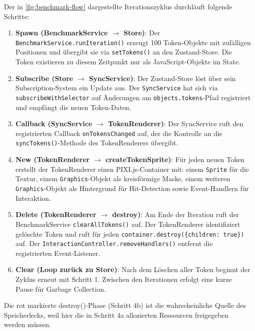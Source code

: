 Der in \autoref{fig:benchmark-flow} dargestellte Iterationszyklus durchläuft folgende Schritte:

\begin{enumerate}
	\item \textbf{Spawn (BenchmarkService $\rightarrow$ Store)}: Der \texttt{BenchmarkService.runIteration()} erzeugt 100 Token-Objekte mit zufälligen Positionen und übergibt sie via \texttt{setTokens()} an den Zustand-Store. Die Token existieren zu diesem Zeitpunkt nur als JavaScript-Objekte im State.

	\item \textbf{Subscribe (Store $\rightarrow$ SyncService)}: Der Zustand-Store löst über sein Subscription-System ein Update aus. Der \texttt{SyncService} hat sich via \texttt{subscribeWithSelector} auf Änderungen am \texttt{objects.tokens}-Pfad registriert und empfängt die neuen Token-Daten.

	\item \textbf{Callback (SyncService $\rightarrow$ TokenRenderer)}: Der SyncService ruft den registrierten Callback \texttt{onTokensChanged} auf, der die Kontrolle an die \texttt{syncTokens()}-Methode des TokenRenderers übergibt.

	\item[4a.] \textbf{New (TokenRenderer $\rightarrow$ createTokenSprite)}: Für jeden neuen Token erstellt der TokenRenderer einen PIXI.js-Container mit: einem \texttt{Sprite} für die Textur, einem \texttt{Graphics}-Objekt als kreisförmige Maske, einem weiteren \texttt{Graphics}-Objekt als Hintergrund für Hit-Detection sowie Event-Handlern für Interaktion.

	\item[4b.] \textbf{Delete (TokenRenderer $\rightarrow$ destroy)}: Am Ende der Iteration ruft der BenchmarkService \texttt{clearAllTokens()} auf. Der TokenRenderer identifiziert gelöschte Token und ruft für jeden \texttt{container.destroy(\{children: true\})} auf. Der \texttt{InteractionController.removeHandlers()} entfernt die registrierten Event-Listener.

	\item \textbf{Clear (Loop zurück zu Store)}: Nach dem Löschen aller Token beginnt der Zyklus erneut mit Schritt 1. Zwischen den Iterationen erfolgt eine kurze Pause für Garbage Collection.
\end{enumerate}

Die rot markierte destroy()-Phase (Schritt 4b) ist die wahrscheinliche Quelle des Speicherlecks, weil hier die in Schritt 4a allozierten Ressourcen freigegeben werden müssen.

